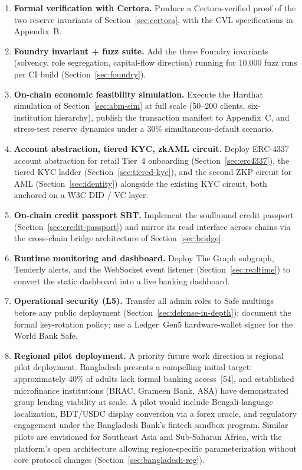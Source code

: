 \documentclass[12pt,a4paper]{report}
\begin{document}
\begin{enumerate}[noitemsep]
\item \textbf{Formal verification with Certora.} Produce a Certora-verified proof of the two reserve invariants of Section~\ref{sec:certora}, with the CVL specifications in Appendix~B.
\item \textbf{Foundry invariant + fuzz suite.} Add the three Foundry invariants (solvency, role segregation, capital-flow direction) running for 10{,}000 fuzz runs per CI build (Section~\ref{sec:foundry}).
\item \textbf{On-chain economic feasibility simulation.} Execute the Hardhat simulation of Section~\ref{sec:abm-sim} at full scale (50--200 clients, six-institution hierarchy), publish the transaction manifest to Appendix~C, and stress-test reserve dynamics under a 30\% simultaneous-default scenario.
\item \textbf{Account abstraction, tiered KYC, zkAML circuit.} Deploy ERC-4337 account abstraction for retail Tier~4 onboarding (Section~\ref{sec:erc4337}), the tiered KYC ladder (Section~\ref{sec:tiered-kyc}), and the second ZKP circuit for AML (Section~\ref{sec:identity}) alongside the existing KYC circuit, both anchored on a W3C DID / VC layer.
\item \textbf{On-chain credit passport SBT.} Implement the soulbound credit passport (Section~\ref{sec:credit-passport}) and mirror its read interface across chains via the cross-chain bridge architecture of Section~\ref{sec:bridge}.
\item \textbf{Runtime monitoring and dashboard.} Deploy The Graph subgraph, Tenderly alerts, and the WebSocket event listener (Section~\ref{sec:realtime}) to convert the static dashboard into a live banking dashboard.
\item \textbf{Operational security (L5).} Transfer all admin roles to Safe multisigs before any public deployment (Section~\ref{sec:defense-in-depth}); document the formal key-rotation policy; use a Ledger~Gen5 hardware-wallet signer for the World Bank Safe.
\item \textbf{Regional pilot deployment.} A priority future work direction is regional pilot deployment. Bangladesh presents a compelling initial target: approximately 40\% of adults lack formal banking access~[54], and established microfinance institutions (BRAC, Grameen Bank, ASA) have demonstrated group lending viability at scale. A pilot would include Bengali-language localization, BDT/USDC display conversion via a forex oracle, and regulatory engagement under the Bangladesh Bank's fintech sandbox program. Similar pilots are envisioned for Southeast Asia and Sub-Saharan Africa, with the platform's open architecture allowing region-specific parameterization without core protocol changes (Section~\ref{sec:bangladesh-reg}).

\end{enumerate}
\end{document}
